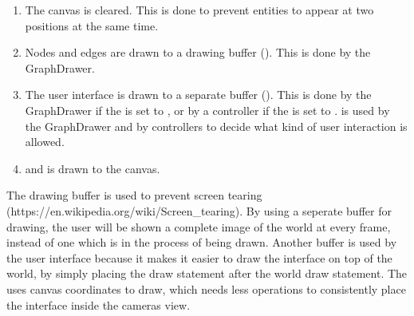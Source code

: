\begin{enumerate}
    \item The canvas is cleared. This is done to prevent entities to appear at two positions at the same time.
    \item Nodes and edges are drawn to a drawing buffer (). This is done by the GraphDrawer.
    \item The user interface is drawn to a separate buffer (). This is done by the GraphDrawer if the  is set to , or by a controller if the  is set to .  is used by the GraphDrawer and by controllers to decide what kind of user interaction is allowed.
    \item {} and  is drawn to the canvas.
\end{enumerate}
The drawing buffer is used to prevent screen tearing (https://en.wikipedia.org/wiki/Screen\_tearing). By using a seperate buffer for drawing, the user will be shown a complete image of the world at every frame, instead of one which is in the process of being drawn. Another buffer is used by the user interface because it makes it easier to draw the interface on top of the world, by simply placing the draw statement after the world draw statement. The  uses canvas coordinates to draw, which needs less operations to consistently place the interface inside the cameras view.
\\[11pt]
